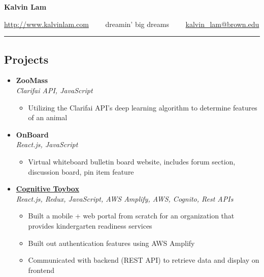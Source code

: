 \documentclass[10pt,letterpaper]{article}
\begin{document}
\begin{center}
{\huge \textbf{Kalvin Lam}}


\href{http://www.kalvinlam.com}{http://www.kalvinlam.com}\ \ \textbullet
\ \ dreamin' big dreams\ \ \textbullet
\ \ \href{malto:kalvin_lam@brown.edu}{kalvin\_lam@brown.edu}

\end{center}

\hrule
\vspace{-1.0em}
\subsection*{Projects}
  \begin{itemize}
    \parskip=-0.5em
    \item[]
    {\textbf{ZooMass} \hfill
      \textbf{}}
    \\
    {\emph{Clarifai API, JavaScript} \hfill \emph{}}

    \begin{itemize}[label=\textbullet]
      \itemsep0em
      \item Utilizing the Clarifai API's deep learning algorithm to determine features of an animal
    \end{itemize}
     \item[]
    {\textbf{OnBoard} \hfill
      \textbf{}}
    \\
    {\emph{React.js, JavaScript} \hfill \emph{}}

    \begin{itemize}[label=\textbullet]
      \itemsep0em
      \item Virtual whiteboard bulletin board website, includes forum section,
discussion board, pin item feature
    \end{itemize}
     \item[]
    {\href{http://www.cognitivetoybox.com/}{\textbf{Cognitive Toybox}} \hfill
      \textbf{}}
    \\
    {\emph{React.js, Redux, JavaScript, AWS Amplify, AWS, Cognito, Rest APIs} \hfill \emph{}}

    \begin{itemize}[label=\textbullet]
      \itemsep0em
      \item Built a mobile + web portal from scratch for an organization that provides kindergarten readiness services 
      \item Built out authentication features using AWS Amplify
      \item Communicated with backend (REST API) to retrieve data and display on frontend
    \end{itemize}
    
\end{itemize}
\end{document}

